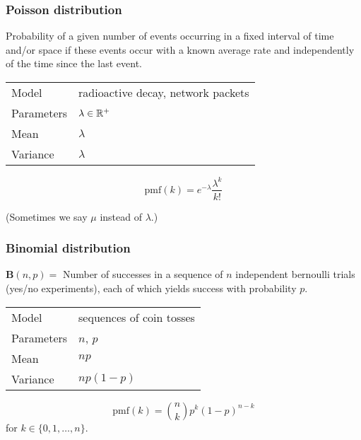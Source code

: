 \begin{frame}
  \frametitle{Poisson distribution}

  Probability of a given number of events occurring in a fixed
  interval of time and/or space if these events occur with a known
  average rate and independently of the time since the last event.
  \bigskip
  
  \begin{tabular}{l|l}
    Model & radioactive decay, network packets\\[1mm]
    Parameters & $\lambda\in \mathbb{R}^+$\\[1mm]
    Mean & $\lambda$\\[1mm]
    Variance & $\lambda$
  \end{tabular}

  \begin{displaymath}
    \text{pmf}(k) = e^{-\lambda} \frac{\lambda^k}{k!}
  \end{displaymath}

  \vspace{6mm}
  (Sometimes we say $\mu$ instead of $\lambda$.) 

  
\end{frame}

\begin{frame}
  \frametitle{Binomial distribution}

  $\mathbf{B}(n,p) = $ Number of successes in a sequence of $n$ independent bernoulli
  trials (yes/no experiments), each of which yields success with
  probability $p$.
  \bigskip

  \begin{tabular}{l|l}
    Model & sequences of coin tosses\\[1mm]
    Parameters & $n$, $p$\\[1mm]
    Mean & $np$\\[1mm]
    Variance & $np(1-p)$
  \end{tabular}

  \vspace{6mm}
   {
    \begin{displaymath}
      \text{pmf}(k) = {n \choose k} p^k (1-p)^{n-k}
    \end{displaymath}
    for $k\in \{0, 1, \dotsc, n\}$.
  }
  
  
\end{frame}

